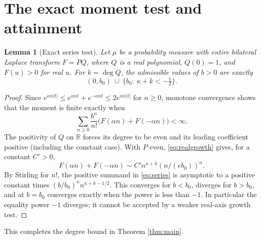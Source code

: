 \documentclass[11pt]{article}
\newtheorem{lemma}[theorem]{Lemma}
\theoremstyle{definition}\newtheorem{definition}[theorem]{Definition}
\theoremstyle{remark}\newtheorem{remark}[theorem]{Remark}
\newcommand{\R}{\mathbb R}\newcommand{\C}{\mathbb C}\newcommand{\dd}{\,\mathrm d}\newcommand{\ord}{\operatorname{ord}}\newcommand{\Rea}{\operatorname{Re}}\newcommand{\Ima}{\operatorname{Im}}\newcommand{\F}{\mathcal F}\newcommand{\G}{\mathcal G}\newcommand{\calL}{\mathcal L}
\begin{document}
\section{The exact moment test and attainment}
\begin{lemma}[Exact series test]\label{lem:series}
Let $\mu$ be a probability measure with entire bilateral Laplace transform $F=P Q$, where $Q$ is a real polynomial, $Q(0)=1$, and $F(u)>0$ for real $u$. For $k=\deg Q$, the admissible values of $b>0$ are exactly
\[
 (0,b_0)\ \cup\ \bigl\{b_0:\ \kappa+k<-\tfrac12\bigr\}.
\]
\end{lemma}
\begin{proof}
Since $e^{\alpha n|t|}\le e^{\alpha nt}+e^{-\alpha nt}\le2e^{\alpha n|t|}$ for $n\ge0$, monotone convergence shows that the moment is finite exactly when
\begin{equation}\label{eq:series}
 \sum_{n\ge0}\frac{b^n}{n!}\bigl(F(\alpha n)+F(-\alpha n)\bigr)<\infty.
\end{equation}
The positivity of $Q$ on $\R$ forces its degree to be even and its leading coefficient positive (including the constant case). With $P$ even, \eqref{eq:realgrowth} gives, for a constant $C'>0$,
\[
 F(\alpha n)+F(-\alpha n)\sim C' n^{\kappa+k}(n/(e b_0))^n.
\]
By Stirling for $n!$, the positive summand in \eqref{eq:series} is asymptotic to a positive constant times $(b/b_0)^n n^{\kappa+k-1/2}$. This converges for $b<b_0$, diverges for $b>b_0$, and at $b=b_0$ converges exactly when the power is less than $-1$. In particular the equality power $-1$ diverges; it cannot be accepted by a weaker real-axis growth test.
\end{proof}
This completes the degree bound in Theorem \ref{thm:main}.
\end{document}
